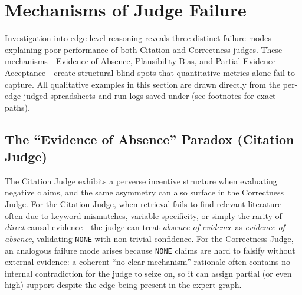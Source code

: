\section{Mechanisms of Judge Failure}
\label{sec:discussion_failure_mechanisms}

Investigation into edge-level reasoning reveals three distinct failure modes explaining poor performance of both Citation and Correctness judges. These mechanisms---Evidence of Absence, Plausibility Bias, and Partial Evidence Acceptance---create structural blind spots that quantitative metrics alone fail to capture.
All qualitative examples in this section are drawn directly from the per-edge judged spreadsheets and run logs saved under \texttt{} (see footnotes for exact paths).

\subsection{The ``Evidence of Absence'' Paradox (Citation Judge)}

The Citation Judge exhibits a perverse incentive structure when evaluating negative claims, and the same asymmetry can also surface in the Correctness Judge. For the Citation Judge, when retrieval fails to find relevant literature---often due to keyword mismatches, variable specificity, or simply the rarity of \textit{direct} causal evidence---the judge can treat \textit{absence of evidence} as \textit{evidence of absence}, validating \texttt{NONE} with non-trivial confidence. For the Correctness Judge, an analogous failure mode arises because \texttt{NONE} claims are hard to falsify without external evidence: a coherent ``no clear mechanism'' rationale often contains no internal contradiction for the judge to seize on, so it can assign partial (or even high) support despite the edge being present in the expert graph.

